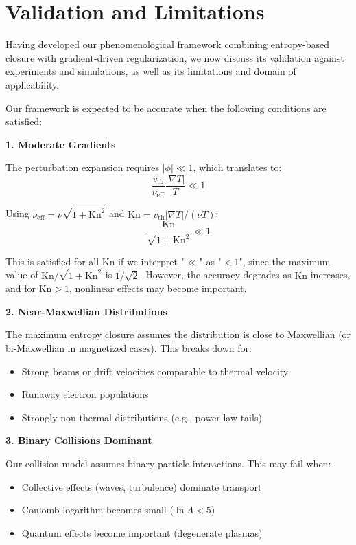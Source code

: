 \documentclass[12pt,a4paper]{article}
\newcommand{\Kn}{\text{Kn}}
\newcommand{\eff}{\text{eff}}
\begin{document}
\section{Validation and Limitations}

Having developed our phenomenological framework combining entropy-based closure with gradient-driven regularization, we now discuss its validation against experiments and simulations, as well as its limitations and domain of applicability.

Our framework is expected to be accurate when the following conditions are satisfied:

\textbf{1. Moderate Gradients}

The perturbation expansion requires $|\phi| \ll 1$, which translates to:
\begin{equation}
\frac{v_{\text{th}}}{\nu_{\eff}} \frac{|\nabla T|}{T} \ll 1
\label{eq:moderate_gradients}
\end{equation}

Using $\nu_{\eff} = \nu\sqrt{1 + \Kn^2}$ and $\Kn = v_{\text{th}}|\nabla T|/(\nu T)$:
\begin{equation}
\frac{\Kn}{\sqrt{1 + \Kn^2}} \ll 1
\label{eq:gradient_condition}
\end{equation}

This is satisfied for all $\Kn$ if we interpret "$\ll$" as "$< 1$", since the maximum value of $\Kn/\sqrt{1 + \Kn^2}$ is $1/\sqrt{2}$. However, the accuracy degrades as $\Kn$ increases, and for $\Kn > 1$, nonlinear effects may become important.

\textbf{2. Near-Maxwellian Distributions}

The maximum entropy closure assumes the distribution is close to Maxwellian (or bi-Maxwellian in magnetized cases). This breaks down for:
\begin{itemize}[leftmargin=*]
\item Strong beams or drift velocities comparable to thermal velocity
\item Runaway electron populations
\item Strongly non-thermal distributions (e.g., power-law tails)
\end{itemize}

\textbf{3. Binary Collisions Dominant}

Our collision model assumes binary particle interactions. This may fail when:
\begin{itemize}[leftmargin=*]
\item Collective effects (waves, turbulence) dominate transport
\item Coulomb logarithm becomes small ($\ln \Lambda < 5$)
\item Quantum effects become important (degenerate plasmas)
\end{itemize}
\end{document}

